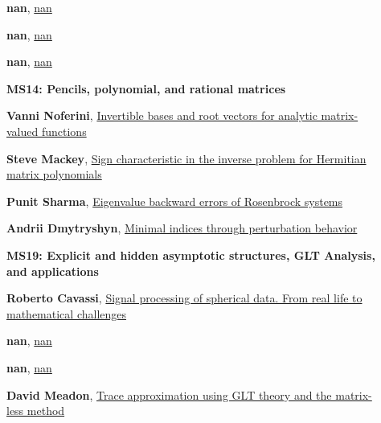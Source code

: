 \documentclass[ILAS2025-program.tex]{subfiles}
\begin{document}
\begin{description}
\begin{description}
        \item[] \hypertarget{up0210}{}\textbf{nan}, \hyperlink{down0210}{nan}
        \item[] \hypertarget{up0211}{}\textbf{nan}, \hyperlink{down0211}{nan}
        \item[] \hypertarget{up0212}{}\textbf{nan}, \hyperlink{down0212}{nan}
        \end{description}
    \begin{description}
    \item[] {\color{mstitle}\textbf{MS14: Pencils, polynomial, and rational matrices}} 
    \item[] \hypertarget{up0213}{}\textbf{Vanni Noferini}, \hyperlink{down0213}{Invertible bases and root vectors for analytic matrix-valued functions}
        \item[] \hypertarget{up0214}{}\textbf{Steve Mackey}, \hyperlink{down0214}{Sign characteristic in the inverse problem for Hermitian matrix polynomials}
        \item[] \hypertarget{up0215}{}\textbf{Punit Sharma}, \hyperlink{down0215}{Eigenvalue backward errors of Rosenbrock systems}
        \item[] \hypertarget{up0216}{}\textbf{Andrii Dmytryshyn}, \hyperlink{down0216}{Minimal indices through perturbation behavior}
        \end{description}
    \begin{description}
    \item[] {\color{mstitle}\textbf{MS19: Explicit and hidden asymptotic structures, GLT Analysis, and applications}} 
    \item[] \hypertarget{up0217}{}\textbf{Roberto Cavassi}, \hyperlink{down0217}{Signal processing of spherical data. From real life to mathematical challenges}
        \item[] \hypertarget{up0218}{}\textbf{nan}, \hyperlink{down0218}{nan}
        \item[] \hypertarget{up0219}{}\textbf{nan}, \hyperlink{down0219}{nan}
        \item[] \hypertarget{up0220}{}\textbf{David Meadon}, \hyperlink{down0220}{Trace approximation using GLT theory and the matrix-less method
}
        \end{description}

\end{description}
\end{document}
